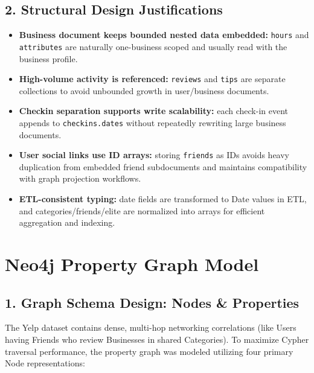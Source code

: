 \documentclass[11pt,a4paper]{article}
\begin{document}
\subsection*{2. Structural Design Justifications}
\begin{itemize}
        \item \textbf{Business document keeps bounded nested data embedded:} \texttt{hours} and \texttt{attributes} are naturally one-business scoped and usually read with the business profile.
        \item \textbf{High-volume activity is referenced:} \texttt{reviews} and \texttt{tips} are separate collections to avoid unbounded growth in user/business documents.
        \item \textbf{Checkin separation supports write scalability:} each check-in event appends to \texttt{checkins.dates} without repeatedly rewriting large business documents.
        \item \textbf{User social links use ID arrays:} storing \texttt{friends} as IDs avoids heavy duplication from embedded friend subdocuments and maintains compatibility with graph projection workflows.
        \item \textbf{ETL-consistent typing:} date fields are transformed to Date values in ETL, and categories/friends/elite are normalized into arrays for efficient aggregation and indexing.
\end{itemize}

\section{Neo4j Property Graph Model}

\subsection*{1. Graph Schema Design: Nodes \& Properties}
The Yelp dataset contains dense, multi-hop networking correlations (like Users having Friends who review Businesses in shared Categories). To maximize Cypher traversal performance, the property graph was modeled utilizing four primary Node representations:
\end{document}
